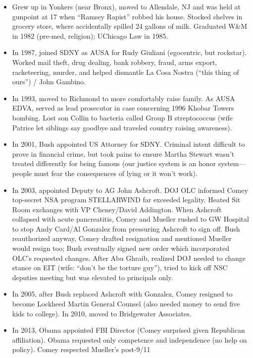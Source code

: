 \documentclass[
]{article}
\begin{document}
\begin{itemize}
\item
  Grew up in Yonkers (near Bronx), moved to Allendale, NJ and was held
  at gunpoint at 17 when ``Ramsey Rapist'' robbed his house. Stocked
  shelves in grocery store, where accidentally spilled 24 gallons of
  milk. Graduated W\&M in 1982 (pre-med, religion); UChicago Law in
  1985.
\item
  In 1987, joined SDNY as AUSA for Rudy Giuliani (egocentric, but
  rockstar). Worked mail theft, drug dealing, bank robbery, fraud, arms
  export, racketeering, murder, and helped dismantle La Cosa Nostra
  (``this thing of ours'') / John Gambino.
\item
  In 1993, moved to Richmond to more comfortably raise family. As AUSA
  EDVA, served as lead prosecutor in case concerning 1996 Khobar Towers
  bombing. Lost son Collin to bacteria called Group B streptococcus
  (wife Patrice let siblings say goodbye and traveled country raising
  awareness).
\item
  In 2001, Bush appointed US Attorney for SDNY. Criminal intent
  difficult to prove in financial crime, but took pains to ensure Martha
  Stewart wasn't treated differently for being famous (our justice
  system is an honor system---people must fear the consequences of lying
  or it won't work).
\item
  In 2003, appointed Deputy to AG John Ashcroft. DOJ OLC informed Comey
  top-secret NSA program STELLARWIND far exceeded legality. Heated Sit
  Room exchanges with VP Cheney/David Addington. When Ashcroft collapsed
  with acute pancreatitis, Comey and Mueller rushed to GW Hospital to
  stop Andy Card/Al Gonzalez from pressuring Ashcroft to sign off. Bush
  reauthorized anyway, Comey drafted resignation and mentioned Mueller
  would resign too; Bush eventually signed new order which incorporated
  OLC's requested changes. After Abu Ghraib, realized DOJ needed to
  change stance on EIT (wife: ``don't be the torture guy''), tried to
  kick off NSC deputies meeting but was elevated to principals only.
\item
  In 2005, after Bush replaced Ashcroft with Gonzalez, Comey resigned to
  become Lockheed Martin General Counsel (also needed money to send five
  kids to college). In 2010, moved to Bridgewater Associates.
\item
  In 2013, Obama appointed FBI Director (Comey surprised given
  Republican affiliation). Obama requested only competence and
  independence (no help on policy). Comey respected Mueller's post-9/11

\end{itemize}
\end{document}
